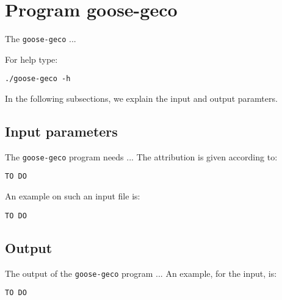 \section{Program goose-geco}
The \texttt{goose-geco} ...

For help type:
\begin{lstlisting}
./goose-geco -h
\end{lstlisting}
In the following subsections, we explain the input and output paramters.

\subsection*{Input parameters}

The \texttt{goose-geco} program needs ...
The attribution is given according to:
\begin{lstlisting}
TO DO
\end{lstlisting}

An example on such an input file is:
\begin{lstlisting}
TO DO
\end{lstlisting}

\subsection*{Output}
The output of the \texttt{goose-geco} program ...
An example, for the input, is:
\begin{lstlisting}
TO DO
\end{lstlisting}